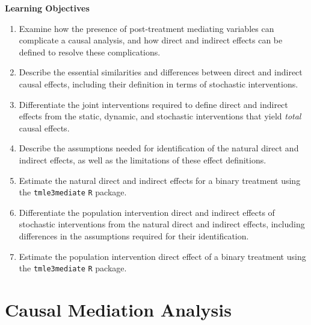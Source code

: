 \documentclass[
  12pt, krantz2,
]{krantz}
\newcommand{\passthrough}[1]{#1}
\providecommand{\tightlist}{%
  \setlength{\itemsep}{0pt}\setlength{\parskip}{0pt}}
\newcommand{\1}{\mathbbm{1}}
\newenvironment{infobox}{
  \definecolor{shadecolor}{rgb}{0.0, 1.0, 1.0}
  \color{black}
  \begin{shaded}
    }{
  \end{shaded}
}
\theoremstyle{definition}
\theoremstyle{definition}
\theoremstyle{definition}
\theoremstyle{definition}
\theoremstyle{remark}
\begin{document}
\begin{infobox}

\begin{center}
\textbf{Learning Objectives}

\end{center}

\begin{enumerate}
\def\labelenumi{\arabic{enumi}.}
\tightlist
\item
  Examine how the presence of post-treatment mediating variables can complicate
  a causal analysis, and how direct and indirect effects can be defined to
  resolve these complications.
\item
  Describe the essential similarities and differences between direct and
  indirect causal effects, including their definition in terms of stochastic
  interventions.
\item
  Differentiate the joint interventions required to define direct and indirect
  effects from the static, dynamic, and stochastic interventions that yield
  \emph{total} causal effects.
\item
  Describe the assumptions needed for identification of the natural direct and
  indirect effects, as well as the limitations of these effect definitions.
\item
  Estimate the natural direct and indirect effects for a binary treatment using
  the \passthrough{\lstinline!tmle3mediate!} \passthrough{\lstinline!R!} package.
\item
  Differentiate the population intervention direct and indirect effects of
  stochastic interventions from the natural direct and indirect effects,
  including differences in the assumptions required for their identification.
\item
  Estimate the population intervention direct effect of a binary treatment
  using the \passthrough{\lstinline!tmle3mediate!} \passthrough{\lstinline!R!} package.
\end{enumerate}

\end{infobox}

\hypertarget{causal-mediation-analysis-1}{%
\section{Causal Mediation Analysis}\label{causal-mediation-analysis-1}}
\end{document}
